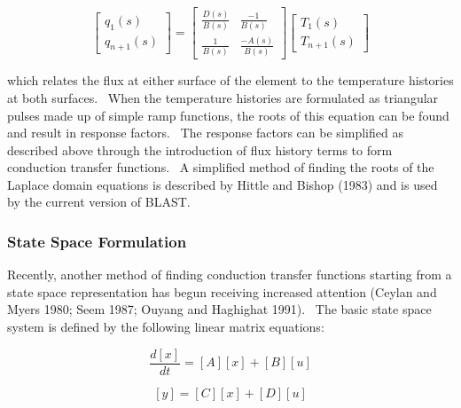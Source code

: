 \begin{equation}
\left[ {\begin{array}{*{20}{c}}{{q_1}\left( s \right)}\\ {{q_{n + 1}}\left( s \right)}\end{array}} \right] = \left[ {\begin{array}{*{20}{c}}{\frac{{D\left( s \right)}}{{B\left( s \right)}}}&{\frac{{ - 1}}{{B\left( s \right)}}}\\ {\frac{1}{{B\left( s \right)}}}&{\frac{{ - A\left( s \right)}}{{B\left( s \right)}}}\end{array}} \right]\left[ {\begin{array}{*{20}{c}}{{T_1}\left( s \right)}\\ {{T_{n + 1}}\left( s \right)}\end{array}} \right]
\end{equation}

which relates the flux at either surface of the element to the temperature histories at both surfaces.~ When the temperature histories are formulated as triangular pulses made up of simple ramp functions, the roots of this equation can be found and result in response factors.~ The response factors can be simplified as described above through the introduction of flux history terms to form conduction transfer functions.~ A simplified method of finding the roots of the Laplace domain equations is described by Hittle and Bishop (1983) and is used by the current version of BLAST.

\subsubsection{State Space Formulation}\label{state-space-formulation}

Recently, another method of finding conduction transfer functions starting from a state space representation has begun receiving increased attention (Ceylan and Myers 1980; Seem 1987; Ouyang and Haghighat 1991).~ The basic state space system is defined by the following linear matrix equations:

\begin{equation}
\frac{{d\left[ x \right]}}{{dt}} = \left[ A \right]\left[ x \right] + \left[ B \right]\left[ u \right]
\end{equation}

\begin{equation}
\left[ y \right] = \left[ C \right]\left[ x \right] + \left[ D \right]\left[ u \right]
\end{equation}

